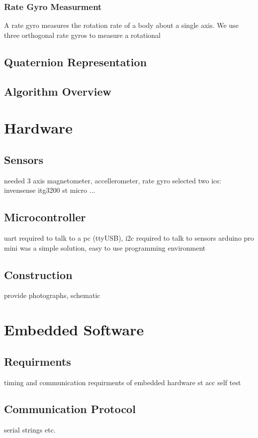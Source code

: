 \documentclass[12pt]{report}
\begin{document}
\subsubsection{Rate Gyro Measurment}

A rate gyro measures the rotation rate of a body about a single axis. We use three orthogonal rate gyros to measure a rotational  

\subsection{Quaternion Representation}

\subsection{Algorithm Overview}

\section{Hardware}
\subsection{Sensors}
needed 3 axis magnetometer, accellerometer, rate gyro
selected two ics:
invensense itg3200
st micro ...
\subsection{Microcontroller}
uart required to talk to a pc (ttyUSB), i2c required to talk to sensors
arduino pro mini was a simple solution, easy to use programming environment
\subsection{Construction}
provide photographs, schematic


\section{Embedded Software}
\subsection{Requirments}
timing and communication requirments of embedded hardware
st acc self test
\subsection{Communication Protocol}
serial strings etc.
\end{document}
